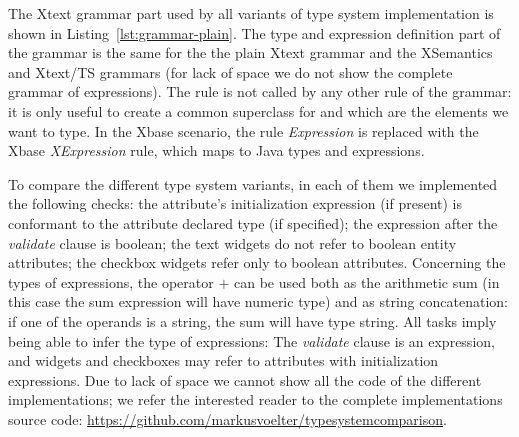 The Xtext grammar part used by all variants of type system implementation is
shown in Listing~\ref{lst:grammar-plain}. The type and expression definition
part of the grammar is the same
for the the plain Xtext grammar and the XSemantics and Xtext/TS grammars (for lack of space we
do not show the complete grammar of expressions).
The rule  is not called by any other rule of the grammar: it is
only useful to create a common superclass for  and
 which are the elements we want to type.
In the Xbase scenario, the rule \emph{Expression} is replaced with the Xbase
\emph{XExpression} rule, which maps to Java types and expressions.


%




To compare the different type system variants, in each of them we implemented
the following checks: the attribute's initialization expression (if present)
is conformant to the attribute declared type (if specified); the expression
after the \emph{validate} clause is boolean; the text widgets do not refer to
boolean entity attributes; the checkbox widgets refer only to boolean
attributes.
Concerning the types of expressions, the operator $+$ can be used both as the
arithmetic sum (in this case the sum expression will have numeric type) and as
string concatenation: if one of the operands is a string, the sum will have type
string.  All tasks imply being able to infer the type of expressions:
The \emph{validate} clause is an expression, and widgets and checkboxes may refer to attributes with
initialization expressions.  Due to lack of space we cannot show all the code of
the different implementations; we refer the interested reader to the complete
implementations source code:
\url{https://github.com/markusvoelter/typesystemcomparison}.
